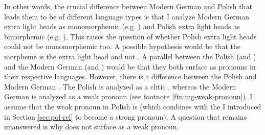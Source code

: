 In other words, the crucial difference between Modern German and Polish that leads them to be of different language types is that I analyze Modern German extra light heads as monomorphemic (e.g. ) and Polish extra light heads as bimorphemic (e.g. ).
This raises the question of whether Polish extra light heads could not be monomorphemic too. A possible hypothesis would be that the morpheme  is the extra light head and not .
A parallel between the Polish  (and ) and the Modern German  (and ) would be that they both surface as pronouns in their respective languages. However, there is a difference between the Polish  and Modern German . The Polish  is analyzed as a clitic \cite{swan2002}, whereas the Modern German  is analyzed as a weak pronoun (see footnote \ref{ftn:mg-weak-pronoun}).
I assume that the weak pronoun in Polish is  (which combines with the  I introduced in Section \ref{sec:pol-rel} to become a strong pronoun). A question that remains unanswered is why  does not surface as a weak pronoun.

